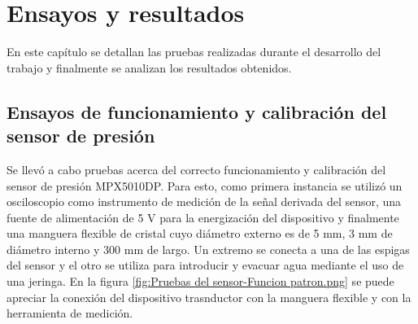 
\chapter{Ensayos y resultados} %

\label{Chapter4} %

En este capítulo se detallan las pruebas realizadas durante el desarrollo del trabajo y finalmente se analizan los resultados obtenidos.
\section{Ensayos de funcionamiento y calibración del sensor de presión}
\label{sec:Ensayos de funcionamiento y calibración del sensor de presión}
Se llevó a cabo pruebas acerca del correcto funcionamiento y calibración del sensor de presión MPX5010DP. Para esto, como primera instancia se utilizó un osciloscopio como instrumento de medición de la señal derivada del sensor, una fuente de alimentación de 5 V para la energización del dispositivo y finalmente una manguera flexible de cristal cuyo diámetro externo es de 5 mm, 3 mm de diámetro interno y 300 mm de largo. Un extremo se conecta a una de las espigas del sensor y el otro se utiliza para introducir y evacuar agua mediante el uso de una jeringa. En la figura \ref{fig:Pruebas del sensor-Funcion patron.png} se puede apreciar la conexión del dispositivo trasnductor con la manguera flexible y con la herramienta de medición.    

